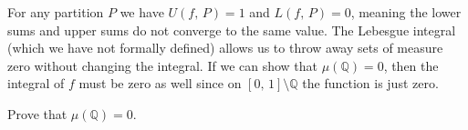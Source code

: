 \documentclass{article}
\theoremstyle{normal}
\newif\ifsolution
\begin{document}
        For any partition $P$ we have $U(f,\,P)=1$ and $L(f,\,P)=0$, meaning
        the lower sums and upper sums do not converge to the same value.
        The Lebesgue integral (which we have not formally defined) allows us
        to throw away sets of measure zero without changing the integral.
        If we can show that $\mu(\mathbb{Q})=0$, then the integral of
        $f$ must be zero as well since on $[0,\,1]\setminus\mathbb{Q}$ the
        function is just zero.
        \par\hfill\par
        Prove that $\mu(\mathbb{Q})=0$.
        \ifsolution
            \color{blue}
            \par\hfill\par
            This will be true for any countable subset of $\mathbb{R}$.
            Let $\varepsilon>0$ and pick a bijection
            $a:\mathbb{N}\rightarrow\mathbb{Q}$. Define $\mathcal{U}_{n}$ by:
            \begin{equation}
                \mathcal{U}_{n}=
                \left(
                    a_{n}-\frac{\varepsilon}{2^{n+2}},\,
                    a_{n}+\frac{\varepsilon}{2^{n+2}}
                \right)
            \end{equation}
            Then $\mu(\mathcal{U}_{n})=\varepsilon/2^{n+1}$. The sum is then:
            \begin{equation}
                \mu(\mathbb{Q})
                <\sum_{n=0}^{\infty}
                    \mu\left(\mathcal{U}_{n}\right)
                =\sum_{n=0}^{\infty}
                    \frac{\varepsilon}{2^{n+1}}
                =\varepsilon
            \end{equation}
        \fi
\end{document}
